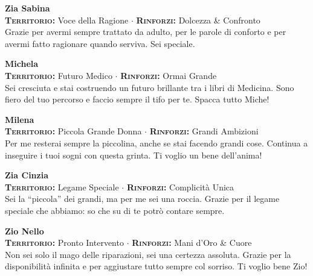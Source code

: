 \noindent\begin{minipage}{\linewidth}
\textbf{Zia Sabina} \\
{\footnotesize \textbf{\textsc{Territorio:}} Voce della Ragione $\cdot$ \textbf{\textsc{Rinforzi:}} Dolcezza \& Confronto} \\
Grazie per avermi sempre trattato da adulto, per le parole di conforto e per avermi fatto ragionare quando serviva. Sei speciale.
\end{minipage}
\vspace{0.6cm}

\noindent\begin{minipage}{\linewidth}
\textbf{Michela} \\
{\footnotesize \textbf{\textsc{Territorio:}} Futuro Medico $\cdot$ \textbf{\textsc{Rinforzi:}} Ormai Grande} \\
Sei cresciuta e stai costruendo un futuro brillante tra i libri di Medicina. Sono fiero del tuo percorso e faccio sempre il tifo per te. Spacca tutto Miche!
\end{minipage}
\vspace{0.6cm}

\noindent\begin{minipage}{\linewidth}
\textbf{Milena} \\
{\footnotesize \textbf{\textsc{Territorio:}} Piccola Grande Donna $\cdot$ \textbf{\textsc{Rinforzi:}} Grandi Ambizioni} \\
Per me resterai sempre la piccolina, anche se stai facendo grandi cose. Continua a inseguire i tuoi sogni con questa grinta. Ti voglio un bene dell'anima!
\end{minipage}
\vspace{0.6cm}

\noindent\begin{minipage}{\linewidth}
\textbf{Zia Cinzia} \\
{\footnotesize \textbf{\textsc{Territorio:}} Legame Speciale $\cdot$ \textbf{\textsc{Rinforzi:}} Complicità Unica} \\
Sei la ``piccola'' dei grandi, ma per me sei una roccia. Grazie per il legame speciale che abbiamo: so che su di te potrò contare sempre.
\end{minipage}
\vspace{0.6cm}

\noindent\begin{minipage}{\linewidth}
\textbf{Zio Nello} \\
{\footnotesize \textbf{\textsc{Territorio:}} Pronto Intervento $\cdot$ \textbf{\textsc{Rinforzi:}} Mani d'Oro \& Cuore} \\
Non sei solo il mago delle riparazioni, sei una certezza assoluta. Grazie per la disponibilità infinita e per aggiustare tutto sempre col sorriso. Ti voglio bene Zio!
\end{minipage}
\vspace{0.6cm}

